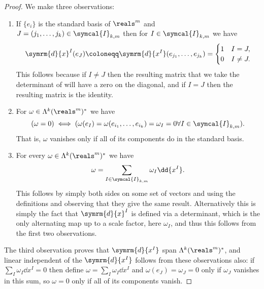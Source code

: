 \documentclass[fleqn]{NotesClass}
\renewcommand{\dl}{\symrm{d}}
\begin{document}
\begin{lma}{}{}
\begin{proof}
            We make three observations:
            \begin{enumerate}
                \item If \(\{e_i\}\) is the standard basis of \(\reals^m\) and \(J = (j_1, \dotsc, j_k) \in \symcal{I}_{k,m}\) then for \(I \in \symcal{I}_{k,m}\) we have
                \begin{equation}
                    \dl{x}^I(e_J) \coloneqq \dl{x^I}(e_{j_1}, \dotsc, e_{j_k}) = 
                    \begin{cases}
                        1 & I = J,\\
                        0 & I \ne J.
                    \end{cases}
                \end{equation}
                This follows because if \(I \ne J\) then the resulting matrix that we take the determinant of will have a zero on the diagonal, and if \(I = J\) then the resulting matrix is the identity.
                \item For \(\omega \in \Lambda^k(\reals^m)^*\) we have
                \begin{equation}
                    (\omega = 0) \iff (\omega(e_I) = \omega(e_{i_1}, \dotsc, e_{i_k}) = \omega_I = 0 \forall I \in \symcal{I}_{k,m}).
                \end{equation}
                That is, \(\omega\) vanishes only if all of its components do in the standard basis.
                \item For every \(\omega \in \Lambda^k(\reals^m)^*\) we have
                \begin{equation}
                    \omega = \sum_{I \in \symcal{I}_{k,m}} \omega_I \dd{x^I}.
                \end{equation}
                This follows by simply both sides on some set of vectors and using the definitions and observing that they give the same result.
                Alternatively this is simply the fact that \(\dl{x}^I\) is defined via a determinant, which is the only alternating map up to a scale factor, here \(\omega_I\), and thus this follows from the first two observations.
            \end{enumerate}
            The third observation proves that \(\dl{x^I}\) span \(\Lambda^k(\reals^m)^*\), and linear independent of the \(\dl{x^I}\) follows from these observations also: if \(\sum_I \omega_I \dd{x^I} = 0\) then define \(\omega = \sum_I \omega_I \dd{x^I}\) and \(\omega(e_J) = \omega_J = 0\) only if \(\omega_J\) vanishes in this sum, so \(\omega = 0\) only if all of its components vanish.
        \end{proof}
    \end{lma}
    
\end{document}
